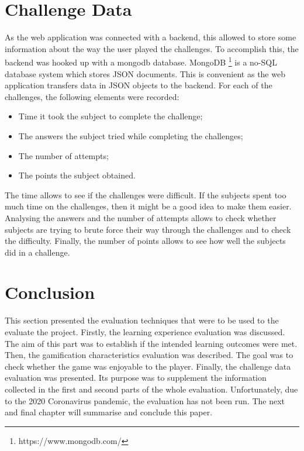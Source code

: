 \documentclass{l4proj}
\begin{document}
\section{Challenge Data}

As the web application was connected with a backend, 
this allowed to store some information about the way the user played the challenges.
To accomplish this, the backend was hooked up with a mongodb database.
MongoDB \footnote{https://www.mongodb.com/} is a no-SQL database system which stores JSON documents.
This is convenient as the web application transfers data in JSON objects to the backend.
For each of the challenges, the following elements were recorded:
\begin{itemize}
    \item Time it took the subject to complete the challenge;
    \item The answers the subject tried while completing the challenges;
    \item The number of attempts;
    \item The points the subject obtained.
\end{itemize}
The time allows to see if the challenges were difficult. If the subjects spent too much time on the challenges,
then it might be a good idea to make them easier.
Analysing the answers and the number of attempts allows to check 
whether subjects are trying to brute force their way through the challenges and to check the difficulty.
Finally, the number of points allows to see how well the subjects did in a challenge.

\section{Conclusion}

This section presented the evaluation techniques that were to be used to the evaluate the project.
Firstly, the learning experience evaluation was discussed. 
The aim of this part was to establish if the intended learning outcomes were met.
Then, the gamification characteristics evaluation was described.
The goal was to check whether the game was enjoyable to the player.
Finally, the challenge data evaluation was presented.
Its purpose was to supplement the information collected in the first and second parts of the whole evaluation.
Unfortunately, due to the 2020 Coronavirus pandemic, the evaluation has not been run.
The next and final chapter will summarise and conclude this paper.

\end{document}
